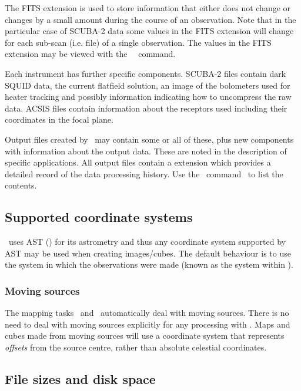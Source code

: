 \documentclass[oneside,11pt]{starlink}
\begin{document}
The FITS extension is used to store information that either does not
change or changes by a small amount during the course of an observation.
Note that in the particular case of SCUBA-2 data some values in the FITS
extension will change for each sub-scan (i.e. file) of a single
observation. The values in the FITS extension may be viewed with the
\KAPPA\ \fitslist\ command.

Each instrument has further specific components. SCUBA-2 files contain
dark SQUID data, the current flatfield solution, an image of the
bolometers used for heater tracking and possibly information
indicating how to uncompress the raw data. ACSIS files contain
information about the receptors used including their coordinates in
the focal plane.

Output files created by \SMURF\ may contain some or all of these, plus
new components with information about the output data. These are noted
in the description of specific applications. All output files contain
a  extension which provides a detailed record of
the data processing history. Use the \KAPPA\ command \provshow\ to list
the contents.

\subsection{Supported coordinate systems}

\SMURF\ uses AST (\astref) for its astrometry and thus any coordinate
system supported by AST may be used when creating images/cubes. The
default behaviour is to use the system in which the observations
were made (known as the  system within \SMURF).

\subsubsection{Moving sources}

The mapping tasks \makemap\ and \makecube\ automatically
deal with moving sources. There is no need to deal with moving sources
explicitly for any processing with \SMURF. Maps and cubes made from
moving sources will use a coordinate system that represents \emph{offsets}
from the source centre, rather than absolute celestial coordinates.

\subsection{File sizes and disk space}
\end{document}
